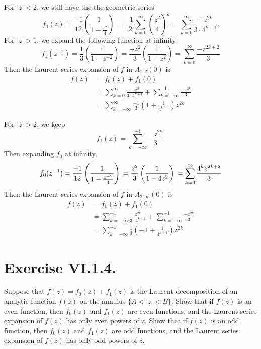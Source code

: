 \documentclass[12pt]{article}
\newenvironment{problem}
    {\begin{lrbox}{\mybox}\begin{minipage}{0.98\textwidth}}
    {\end{minipage}\end{lrbox}\begin{center}\framebox[\textwidth]{\usebox{\mybox}}\end{center}}
\theoremstyle{definition}
\begin{document}
For $|z| < 2$, we still have the the geometric series
\[
    f_0(z)
        = \frac{-1}{12}\left(\frac{1}{1-\frac{z^2}{4}}\right)
        = \frac{-1}{12} \sum_{k=0}^\infty \left(\frac{z^2}{4}\right)^k
        = \sum_{k=0}^\infty \frac{-z^{2k}}{3 \cdot 4^{k+1}}.
\]
For $|z| > 1$, we expand the following function at infinity:
\[
    f_1(z^{-1})
        = \frac13\left(\frac{1}{1-z^{-2}}\right)
        = \frac{-z^2}{3}\left(\frac{1}{1 - z^2}\right)
        = \sum_{k=0}^\infty \frac{-z^{2k + 2}}{3}
\]
Then the Laurent series expansion of $f$ in $A_{1, 2}(0)$ is
\begin{align*}
    f(z) 
        &= f_0(z) + f_1(0) \\
        &= \sum_{k=0}^\infty \frac{-z^{2k}}{3 \cdot 4^{k+1}} + \sum_{k=-\infty}^{-1} \frac{-z^{2k}}{3} \\
        &= \sum_{k=-\infty}^\infty \frac{-1}{3}\left(1 + \frac{1}{4^{k+1}}\right)z^{2k}
\end{align*}

For $|z| > 2$, we keep
\[
    f_1(z) = \sum_{k=-\infty}^{-1} \frac{-z^{2k}}{3}.
\]
Then expanding $f_0$ at infinity, 
\[
    f_0(z^{-1})
        = \frac{-1}{12}\left(\frac{1}{1-\frac{z^{-2}}{4}}\right) \\
        = \frac{z^2}{3}\left(\frac{1}{1-4z^2}\right) \\
        = \sum_{k=0}^\infty \frac{4^k z^{2k+2}}{3}
\]
Then the Laurent series expansion of $f$ in $A_{2, \infty}(0)$ is
\begin{align*}
    f(z)
        &= f_0(z) + f_1(0) \\
        &= \sum_{k=-\infty}^{-1} \frac{z^{2k}}{3\cdot 4^{k+1}} + \sum_{k=-\infty}^{-1} \frac{-z^{2k}}{3} \\
        &= \sum_{k=-\infty}^{-1} \frac{1}{3}\left(-1 + \frac{1}{4^{k+1}}\right) z^{2k}
\end{align*}



\newpage
\section{Exercise VI.1.4.}
\begin{problem}
    Suppose that $f(z) = f_0(z) + f_1(z)$ is the Laurent decomposition of an analytic function $f(z)$ on the annulus $\{A < |z| < B\}$. Show that if $f(z)$ is an even function, then $f_0(z)$ and $f_1(z)$ are even functions, and the Laurent series expansion of $f(z)$ has only even powers of $z$. Show that if $f(z)$ is an odd function, then $f_0(z)$ and $f_1(z)$ are odd functions, and the Laurent series expansion of $f(z)$ has only odd powers of $z$.
\end{problem}
\end{document}
